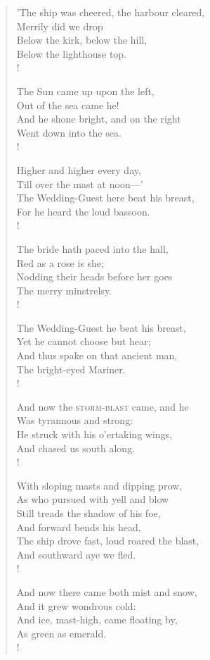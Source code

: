 \documentclass[10pt,twoside]{memoir}
\begin{document}
\begin{verse}
'The ship was cheered, the harbour cleared, \\
Merrily did we drop \\
Below the kirk, below the hill, \\
Below the lighthouse top. \\!

The Sun came up upon the left, \\
Out of the sea came he! \\
And he shone bright, and on the right \\
Went down into the sea. \\!

Higher and higher every day, \\
Till over the mast at noon—' \\
The Wedding-Guest here beat his breast, \\
For he heard the loud bassoon. \\!

The bride hath paced into the hall, \\
Red as a rose is she; \\
Nodding their heads before her goes \\
The merry minstrelsy. \\!

The Wedding-Guest he beat his breast, \\
Yet he cannot choose but hear; \\
And thus spake on that ancient man, \\
The bright-eyed Mariner. \\!

And now the \textsc{storm-blast} came, and he \\
Was tyrannous and strong: \\
He struck with his o'ertaking wings, \\
And chased us south along. \\!

With sloping masts and dipping prow, \\
As who pursued with yell and blow \\
Still treads the shadow of his foe, \\
And forward bends his head, \\
The ship drove fast, loud roared the blast, \\
And southward aye we fled. \\!

And now there came both mist and snow, \\
And it grew wondrous cold: \\
And ice, mast-high, came floating by, \\
As green as emerald. \\!


\end{verse}
\end{document}

